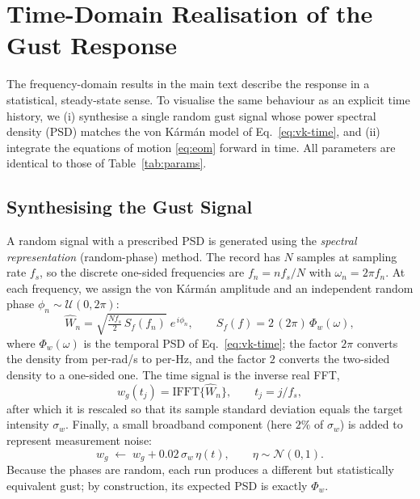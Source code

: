 \documentclass[11pt]{article}
\begin{document}
\section{Time-Domain Realisation of the Gust Response}
\label{sec:time}

The frequency-domain results in the main text describe the response in a statistical,
steady-state sense. To visualise the same behaviour as an explicit time history, we (i)
synthesise a single random gust signal whose power spectral density (PSD) matches the von
K\'arm\'an model of Eq.~\eqref{eq:vk-time}, and (ii) integrate the equations of motion
\eqref{eq:eom} forward in time. All parameters are identical to those of
Table~\ref{tab:params}.

\subsection{Synthesising the Gust Signal}
A random signal with a prescribed PSD is generated using the \emph{spectral
representation} (random-phase) method. The record has $N$ samples at sampling rate $f_s$,
so the discrete one-sided frequencies are $f_n=n f_s/N$ with $\omega_n=2\pi f_n$. At each
frequency, we assign the von K\'arm\'an amplitude and an independent random phase
$\phi_n\sim\mathcal U(0,2\pi)$:
\begin{equation}
\hat W_n=\sqrt{\tfrac{N f_s}{2}\,S_f(f_n)}\;e^{\,i\phi_n},
\qquad
S_f(f)=2\,(2\pi)\,\Phi_w(\omega),
\label{eq:synth}
\end{equation}
where $\Phi_w(\omega)$ is the temporal PSD of Eq.~\eqref{eq:vk-time}; the factor $2\pi$
converts the density from per-rad/s to per-Hz, and the factor $2$ converts the two-sided
density to a one-sided one. The time signal is the inverse real FFT,
\begin{equation}
w_g(t_j)=\mathrm{IFFT}\{\hat W_n\}, \qquad t_j=j/f_s,
\end{equation}
after which it is rescaled so that its sample standard deviation equals the target intensity
$\sigma_w$. Finally, a small broadband component (here $2\%$ of $\sigma_w$) is added to
represent measurement noise:
\begin{equation}
w_g\;\leftarrow\;w_g+0.02\,\sigma_w\,\eta(t),\qquad \eta\sim\mathcal N(0,1).
\end{equation}
Because the phases are random, each run produces a different but statistically equivalent
gust; by construction, its expected PSD is exactly $\Phi_w$.
\end{document}

